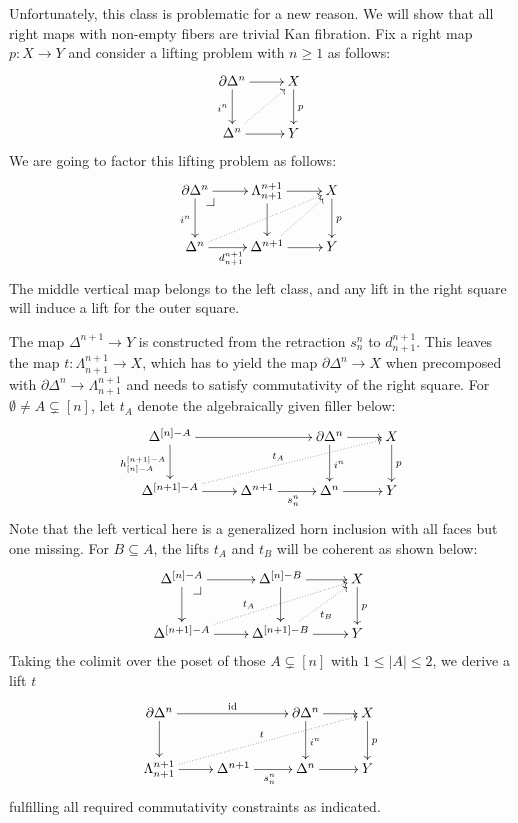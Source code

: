 \documentclass[reqno,10pt,a4paper,oneside]{amsart}
\begin{document}
Unfortunately, this class is problematic for a new reason.
We will show that all right maps with non-empty fibers are trivial Kan fibration.
Fix a right map $p : X \to Y$ and consider a lifting problem with $n \geq 1$ as follows:
\[
\xymatrix{
  \partial \Delta^n
  \ar[r]
  \ar[d]_{i^n}
&
  X
  \ar[d]^{p}
\\
  \Delta^n
  \ar[r]
  \ar@{.>}[ur]
&
  Y
}
\]
We are going to factor this lifting problem as follows:
\[
\xymatrix{
  \partial \Delta^n
  \ar[r]
  \ar[d]_{i^n}
  \pullback{dr}
&
  \Lambda_{n+1}^{n+1}
  \ar[r]
  \ar[d]
&
  X
  \ar[d]^{p}
\\
  \Delta^n
  \ar[r]_{d_{n+1}^{n+1}}
  \ar@{.>}[urr]
&
  \Delta^{n+1}
  \ar[r]
  \ar@{.>}[ur]
&
  Y
}
\]
The middle vertical map belongs to the left class, and any lift in the right square will induce a lift for the outer square.

The map $\Delta^{n+1} \to Y$ is constructed from the retraction $s_n^n$ to $d_{n+1}^{n+1}$.
This leaves the map $t : \Lambda_{n+1}^{n+1} \to X$, which has to yield the map $\partial \Delta^n \to X$ when precomposed with $\partial \Delta^n \to \Lambda_{n+1}^{n+1}$ and needs to satisfy commutativity of the right square.
For $\emptyset \neq A \subsetneq [n]$, let $t_A$ denote the algebraically given filler below:
\[
\xymatrix{
  \Delta^{[n] - A}
  \ar[rr]
  \ar[d]_{h_{[n] - A}^{[n+1] - A}}
&&
  \partial \Delta^n
  \ar[r]
  \ar[d]^{i^n}
&
  X
  \ar[d]^{p}
\\
  \Delta^{[n+1] - A}
  \ar[r]
  \ar@{.>}[urrr]^{t_A}
&
  \Delta^{n+1}
  \ar[r]_{s_n^n}
&
  \Delta^n
  \ar[r]
&
  Y
}
\]
Note that the left vertical here is a generalized horn inclusion with all faces but one missing.
For $B \subseteq A$, the lifts $t_A$ and $t_B$ will be coherent as shown below:
\[
\xymatrix{
  \Delta^{[n] - A}
  \ar[r]
  \ar[d]
  \pullback{dr}
&
  \Delta^{[n] - B}
  \ar[r]
  \ar[d]
&
  X
  \ar[d]^{p}
\\
  \Delta^{[n+1] - A}
  \ar[r]
  \ar@{.>}[urr]^(0.4){t_A}
&
  \Delta^{[n+1] - B}
  \ar[r]
  \ar@{.>}[ur]_{t_B}
&
  Y
}
\]
Taking the colimit over the poset of those $A \subsetneq [n]$ with $1 \leq |A| \leq 2$, we derive a lift $t$
\[
\xymatrix{
  \partial \Delta^n
  \ar[rr]^{\id}
  \ar[d]
  &&
  \partial \Delta^n
  \ar[r]
  \ar[d]^{i^n}
  &
  X
  \ar[d]^{p}
  \\
  \Lambda_{n+1}^{n+1}
  \ar[r]
  \ar@{.>}[urrr]^{t}
  &
  \Delta^{n+1}
  \ar[r]_{s_n^n}
  &
  \Delta^n
  \ar[r]
  &
  Y
}
\]
fulfilling all required commutativity constraints as indicated.
\end{document}
